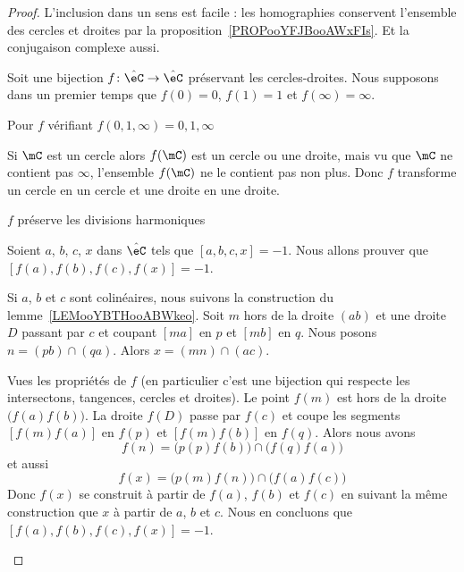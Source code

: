 \begin{proof}
	L'inclusion dans un sens est facile : les homographies conservent l'ensemble des cercles et droites par la proposition~\ref{PROPooYFJBooAWxFIs}. Et la conjugaison complexe aussi.

	Soit une bijection \( f\colon \hat \eC\to \hat\eC\) préservant les cercles-droites. Nous supposons dans un premier temps que \( f(0)=0\), \( f(1)=1\) et \( f(\infty)=\infty\).

	\begin{subproof}
		\item[Pour \( f\) vérifiant \( f(0,1,\infty)=0,1,\infty\)]

		Si \( \mC\) est un cercle alors \( f(\mC)\) est un cercle ou une droite, mais vu que \( \mC\) ne contient pas \( \infty\), l'ensemble \( f(\mC)\) ne le contient pas non plus. Donc \( f\) transforme un cercle en un cercle et une droite en une droite.

		\begin{subproof}
			\item[\( f\) préserve les divisions harmoniques]

			Soient \( a\), \( b\), \( c\), \( x\) dans \( \hat\eC\) tels que \( [a,b,c,x]=-1\). Nous allons prouver que \( [f(a),f(b),f(c),f(x)]=-1\).


			Si \( a\), \( b\) et \( c\) sont colinéaires, nous suivons la construction du lemme~\ref{LEMooYBTHooABWkeo}. Soit \( m\) hors de la droite \( (ab)\) et une droite \( D\) passant par \( c\) et coupant \( [ma]\) en \( p\) et \( [mb]\) en \( q\). Nous posons \( n=(pb)\cap(qa)\). Alors \( x=(mn)\cap(ac)\).

			Vues les propriétés de \( f\) (en particulier c'est une bijection qui respecte les intersectons, tangences, cercles et droites). Le point \( f(m)\) est hors de la droite \( \big( f(a)f(b) \big)\). La droite \( f(D)\) passe par \( f(c)\) et coupe les segments \( [f(m)f(a)]\) en \( f(p)\) et \( [f(m)f(b)]\) en \( f(q)\). Alors nous avons
			\begin{equation}
				f(n)=\big( p(p)f(b) \big)\cap\big( f(q)f(a) \big)
			\end{equation}
			et aussi
			\begin{equation}
				f(x)=\big( p(m)f(n) \big)\cap\big( f(a)f(c) \big)
			\end{equation}
			Donc \( f(x)\) se construit à partir de \( f(a)\), \( f(b)\) et \( f(c)\) en suivant la même construction que \( x\) à partir de \( a\), \( b\) et \( c\). Nous en concluons que \( [f(a), f(b),f(c),f(x)]=-1\).


\end{subproof}
\end{subproof}
\end{proof}
